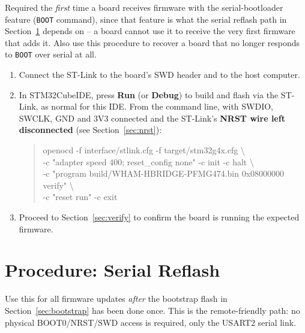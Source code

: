 \documentclass[11pt]{article}
\newcommand{\code}[1]{\texttt{#1}}
\begin{document}
Required the \emph{first} time a board receives firmware with the
serial-bootloader feature (\code{BOOT} command), since that feature is
what the serial reflash path in Section~\ref{sec:serial-flash} depends
on -- a board cannot use it to receive the very first firmware that adds
it. Also use this procedure to recover a board that no longer responds
to \code{BOOT} over serial at all.

\begin{enumerate}[label=\arabic*.]
  \item Connect the ST-Link to the board's SWD header and to the host
    computer.
  \item In STM32CubeIDE, press \textbf{Run} (or \textbf{Debug}) to build
    and flash via the ST-Link, as normal for this IDE. From the command
    line, with SWDIO, SWCLK, GND and 3V3 connected and the ST-Link's
    \textbf{NRST wire left disconnected} (see Section~\ref{sec:nrst}):
\begin{quote}\ttfamily\small\raggedright
openocd -f interface/stlink.cfg -f target/stm32g4x.cfg \textbackslash\\
\hspace*{1em}-c "adapter speed 400; reset\_config none" -c init -c halt
\textbackslash\\
\hspace*{1em}-c "program build/WHAM-HBRIDGE-PFMG474.bin 0x08000000 verify"
\textbackslash\\
\hspace*{1em}-c "reset run" -c exit
\end{quote}
  \item Proceed to Section~\ref{sec:verify} to confirm the board is
    running the expected firmware.
\end{enumerate}

\section{Procedure: Serial Reflash}
\label{sec:serial-flash}

Use this for all firmware updates \emph{after} the bootstrap flash in
Section~\ref{sec:bootstrap} has been done once. This is the
remote-friendly path: no physical BOOT0\slash NRST\slash SWD access is
required, only the USART2 serial link.
\end{document}
